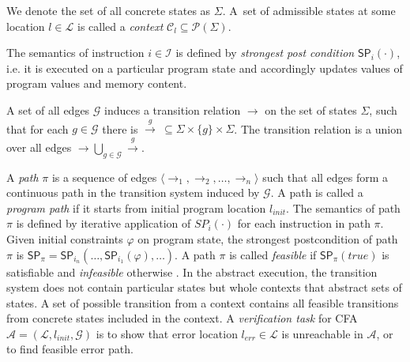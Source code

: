 \noindent
We denote the set of all concrete states as $\Sigma$.  A~set of admissible
states at some location $l \in \mathcal{L}$ is called a \emph{context}
$\mathcal{C}_l \subseteq \mathcal{P}(\Sigma)$.

The semantics of instruction $i \in \mathcal{I}$ is defined by \emph{strongest
post condition} $\textsf{SP}_{i}(\cdot)$, i.e. it is executed on a particular program
state and accordingly updates values of program values and memory content.

A set of all edges $\mathcal{G}$ induces a transition relation $\rightarrow$ on
the set of states $\Sigma$, such that for each $g \in \mathcal{G}$ there is
$\xrightarrow{g} \: \subseteq \Sigma \times \{g\} \times \Sigma$. The
transition relation is a union over all edges $\rightarrow \bigcup_{g
\in\mathcal{G}} \xrightarrow{g}$.

A \emph{path} $\pi$ is a sequence of edges $\langle
\rightarrow_1, \rightarrow_2, \dots, \rightarrow_n \rangle$ such that all edges
form a continuous path in the transition system induced by $\mathcal{G}$.  A path
is called a \emph{program path} if it starts from initial program location
$l_{\textit{init}}$. The semantics of path $\pi$ is defined by iterative
application of $SP_{i}( \cdot )$ for each instruction in path $\pi$. Given
initial constraints $\varphi$ on program state, the strongest postcondition of
path $\pi$ is $\textsf{SP}_{\pi} =
\textsf{SP}_{i_n}(\dots,\textsf{SP}_{i_1}(\varphi),\dots)$. A path $\pi$ is
called \emph{feasible} if $\textsf{SP}_{\pi}(\textit{true})$ is satisfiable and
\emph{infeasible} otherwise \cite{Beyer2018b}.  In the abstract execution, the
transition system does not contain particular states but whole contexts that
abstract sets of states. A set of possible transition from a context contains
all feasible transitions from concrete states included in the context.
A \emph{verification task} for  CFA $\mathcal{A} = (\mathcal{L},
l_{\textit{init}}, \mathcal{G})$ is to show that error location
$l_{\textit{err}} \in \mathcal{L}$ is unreachable in $\mathcal{A}$, or to find
feasible error path.

